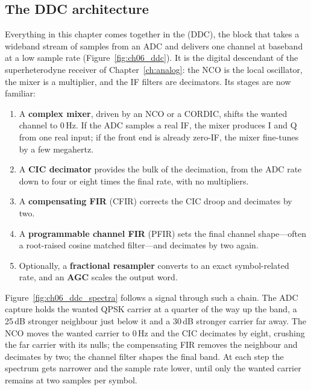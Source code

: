 \subsection{The DDC architecture}

Everything in this chapter comes together in the  (DDC), the block that
takes a wideband stream of samples from an ADC and delivers one channel at baseband at a low sample
rate (Figure~\ref{fig:ch06_ddc}). It is the digital descendant of the superheterodyne receiver of
Chapter~\ref{ch:analog}: the NCO is the local oscillator, the mixer is a multiplier, and the IF
filters are decimators. Its stages are now familiar:
\begin{enumerate}
\item A \textbf{complex mixer}, driven by an NCO or a CORDIC, shifts the wanted channel to 0\,Hz. If the
ADC samples a real IF, the mixer produces I and Q from one real input; if the front end is already
zero-IF, the mixer fine-tunes by a few megahertz.
\item A \textbf{CIC decimator} provides the bulk of the decimation, from the ADC rate down to four or
eight times the final rate, with no multipliers.
\item A \textbf{compensating FIR} (CFIR) corrects the CIC droop and decimates by two.
\item A \textbf{programmable channel FIR} (PFIR) sets the final channel shape---often a root-raised
cosine matched filter---and decimates by two again.
\item Optionally, a \textbf{fractional resampler} converts to an exact symbol-related rate, and an
\textbf{AGC} scales the output word.
\end{enumerate}


Figure~\ref{fig:ch06_ddc_spectra} follows a signal through such a chain. The ADC capture holds the
wanted QPSK carrier at a quarter of the way up the band, a 25\,dB stronger neighbour just below it
and a 30\,dB stronger carrier far away. The NCO moves the wanted carrier to 0\,Hz and the CIC
decimates by eight, crushing the far carrier with its nulls; the compensating FIR removes the
neighbour and decimates by two; the channel filter shapes the final band. At each step the
spectrum gets narrower and the sample rate lower, until only the wanted carrier remains at two
samples per symbol.


